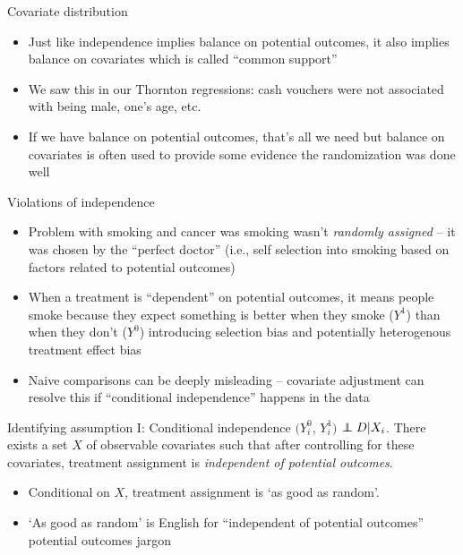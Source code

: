 \documentclass{beamer}
\newcommand\independent{\protect\mathpalette{\protect\independenT}{\perp}}
\def\independenT#1#2{\mathrel{\rlap{$#1#2$}\mkern2mu{#1#2}}}
\begin{document}
\begin{frame}{Covariate distribution}

\begin{itemize}
\item Just like independence implies balance on potential outcomes, it also implies balance on covariates which is called ``common support''
\item We saw this in our Thornton regressions: cash vouchers were not associated with being male, one's age, etc.
\item If we have balance on potential outcomes, that's all we need but balance on covariates is often used to provide some evidence the randomization was done well
\end{itemize}
\end{frame}

\begin{frame}{Violations of independence}

\begin{itemize}
\item Problem with smoking and cancer was smoking wasn't \emph{randomly assigned} -- it was chosen by the ``perfect doctor'' (i.e., self selection into smoking based on factors related to potential outcomes)
\item When a treatment is ``dependent'' on potential outcomes, it means people smoke because they expect something is better when they smoke ($Y^1$) than when they don't ($Y^0$) introducing selection bias and potentially heterogenous treatment effect bias
\item Naive comparisons can be deeply misleading -- covariate adjustment can resolve this if ``conditional independence'' happens in the data
\end{itemize}

\end{frame}



\begin{frame}[plain]

	\begin{block}{Identifying assumption I: Conditional independence}
	$(Y_i^0$, $Y_i^1)$ $\independent{D} | X_i$. There exists a set $X$ of observable covariates such that after controlling for these covariates, treatment assignment is \emph{independent of potential outcomes}.
	\end{block}
	
	\begin{itemize}
	\item Conditional on $X$, treatment assignment is `as good as random'. 
	\item `As good as random' is English for ``independent of potential outcomes'' potential outcomes jargon
	\end{itemize}
\end{frame}
\end{document}
